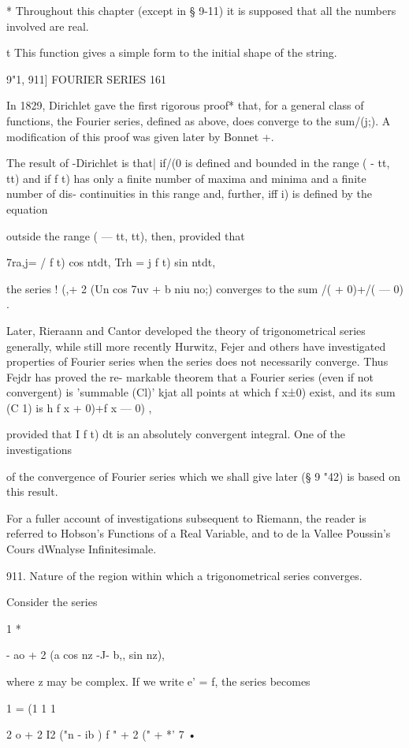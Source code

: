 * Throughout this chapter (except in § 9-11) it is supposed that all
the numbers involved are real.

t This function gives a simple form to the initial shape of the
string.

9"1, 911] FOURIER SERIES 161

In 1829, Dirichlet gave the first rigorous proof* that, for a general
class of functions, the Fourier series, defined as above, does
converge to the sum/(j;). A modification of this proof was given later
by Bonnet +.

The result of -Dirichlet is that| if/(0 is defined and bounded in the
range ( - tt, tt) and if f t) has only a finite number of maxima and
minima and a finite number of dis- continuities in this range and,
further, iff i) is defined by the equation

outside the range ( — tt, tt), then, provided that

7ra,j= / f t) cos ntdt, Trh = j f t) sin ntdt,

the series ! (,+ 2 (Un cos 7uv + b niu no;) converges to the sum /( +
0)+/( — 0) .

Later, Rieraann and Cantor developed the theory of trigonometrical
series generally, while still more recently Hurwitz, Fejer and others
have investigated properties of Fourier series when the series does
not necessarily converge. Thus Fejdr has proved the re- markable
theorem that a Fourier series (even if not convergent) is 'summable
(Cl)' kjat all points at which f x±0) exist, and its sum (C 1) is h f
x + 0)+f x — 0) ,

provided that I f t) dt is an absolutely convergent integral. One of
the investigations

of the convergence of Fourier series which we shall give later (§ 9
"42) is based on this result.

For a fuller account of investigations subsequent to Riemann, the
reader is referred to Hobson's Functions of a Real Variable, and to de
la Vallee Poussin's Cours dWnalyse Infinitesimale.

911. Nature of the region within which a trigonometrical series
converges.

Consider the series

1 *

- ao + 2 (a cos nz -J- b,, sin nz),

where z may be complex. If we write e' = f, the series becomes

1 = (1 1 1

2 o + 2 I2 ("n - ib ) f " + 2 (" + *' 7 •

